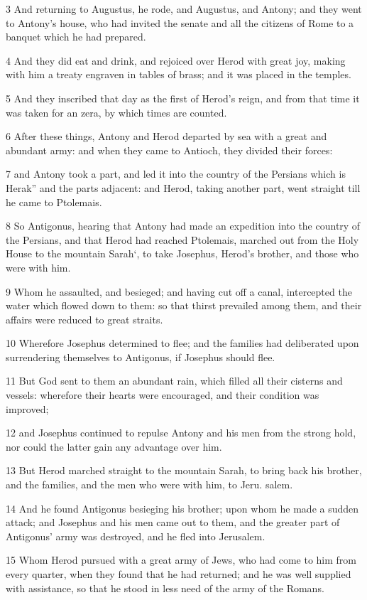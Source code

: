 3 And returning to Augustus, he rode, and Augustus, and Antony; and they went to Antony’s house, who had invited the senate and all the citizens of Rome to a banquet which he had prepared. 

4 And they did eat and drink, and rejoiced over Herod with great joy, making with him a treaty engraven in tables of brass; and it was placed in the temples. 

5 And they inscribed that day as the first of Herod’s reign, and from that time it was taken for an zera, by which times are counted. 

6 After these things, Antony and Herod departed by sea with a great and abundant army: and when they came to Antioch, they divided their forces: 

7 and Antony took a part, and led it into the country of the Persians which is Herak” and the parts adjacent: and Herod, taking another part, went straight till he came to Ptolemais. 

8 So Antigonus, hearing that Antony had made an expedition into the country of the Persians, and that Herod had reached Ptolemais, marched out from the Holy House to the mountain Sarah‘, to take Josephus, Herod’s brother, and those who were with him. 

9 Whom he assaulted, and besieged; and having cut off a canal, intercepted the water which flowed down to them: so that thirst prevailed among them, and their affairs were reduced to great straits. 

10 Wherefore Josephus determined to flee; and the families had deliberated upon surrendering themselves to Antigonus, if Josephus should flee. 

11 But God sent to them an abundant rain, which filled all their cisterns and vessels: wherefore their hearts were encouraged, and their condition was improved; 

12 and Josephus continued to repulse Antony and his men from the strong hold, nor could the latter gain any advantage over him. 

13 But Herod marched straight to the mountain Sarah, to bring back his brother, and the families, and the men who were with him, to Jeru. salem. 

14 And he found Antigonus besieging his brother; upon whom he made a sudden attack; and Josephus and his men came out to them, and the greater part of Antigonus’ army was destroyed, and he fled into Jerusalem. 

15 Whom Herod pursued with a great army of Jews, who had come to him from every quarter, when they found that he had returned; and he was well supplied with assistance, so that he stood in less need of the army of the Romans. 

